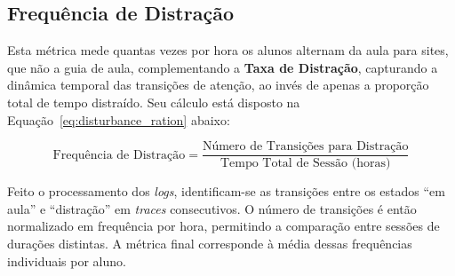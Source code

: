 \subsection{Frequência de Distração}
Esta métrica mede quantas vezes por hora os alunos alternam da aula para sites, que não a guia de aula, complementando a \textbf{Taxa de Distração}, capturando a dinâmica temporal das transições de atenção, ao invés de apenas a proporção total de tempo distraído. Seu cálculo está disposto na Equação~\ref{eq:disturbance_ration} abaixo:

\begin{equation}\label{eq:disturbance_ration}
\text{Frequência de Distração} = \frac{\text{Número de Transições para Distração}}{\text{Tempo Total de Sessão (horas)}}
\end{equation}

% 

Feito o processamento dos \textit{logs}, identificam-se as transições entre os estados “em aula” e “distração” em \textit{traces} consecutivos. O número de transições é então normalizado em frequência por hora, permitindo a comparação entre sessões de durações distintas. A métrica final corresponde à média dessas frequências individuais por aluno.


